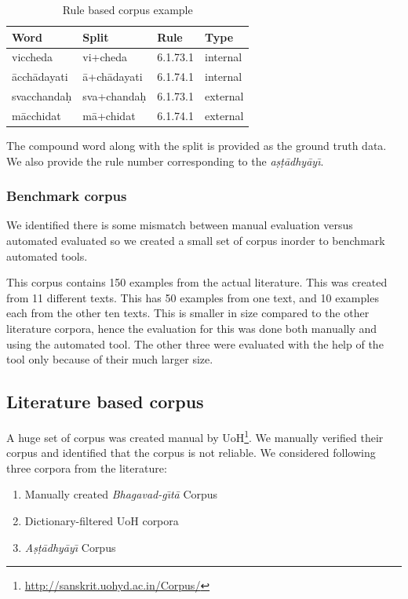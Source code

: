 \documentclass[11pt]{article}
\begin{document}
\begin{table}[h]
	\begin{center}
		\begin{tabular}{|p{1.9cm}|p{1.9cm}|p{1.1cm}|p{1.1cm}|}
			\hline 
			\bf Word	& \bf Split	& \bf Rule	& \bf Type \\
			\hline
			viccheda &	vi+cheda &	6.1.73.1 &	internal \\
			\={a}cch\={a}dayati	& \={a}+ch\={a}dayati	& 6.1.74.1	&	internal \\
			svacchanda\d{h}	& sva+chanda\d{h}	& 6.1.73.1 &	external \\
			m\={a}cchidat &	m\={a}+chidat &	6.1.74.1 &	external\\
			
			\hline
		\end{tabular}
	\end{center}
	\caption{\label{ruletable} Rule based corpus example }
\end{table}

The compound word along with the split is provided as the ground truth data. We also provide the rule number corresponding to the  \textit{a\d{s}\d{t}\={a}dhy\={a}y\={\i}}. 

\subsubsection{Benchmark corpus}
We identified there is some mismatch between manual evaluation versus automated evaluated so we created a small set of corpus inorder to benchmark automated tools.

This corpus contains 150 examples from the actual literature.  This was created from 11 different texts. This has 50 examples from one text, and 10 examples each from the other ten texts. This is smaller in size compared to the other literature corpora, hence the evaluation for this was done both manually and using the automated tool. The other three were evaluated with the help of the tool only because of their much larger size.

\subsection{Literature based corpus}
A huge set of corpus was created manual by UoH\footnote{\url{http://sanskrit.uohyd.ac.in/Corpus/}}. We manually verified their corpus and identified that the corpus is not reliable. We considered following three corpora from the literature: 

\begin{enumerate}
	\item  Manually created \textit{Bhagavad-g\={\i}t\={a}} Corpus
	\item  Dictionary-filtered UoH corpora
	\item  \textit{A\d{s}\d{t}\={a}dhy\={a}y\={\i}} Corpus
\end{enumerate}
\end{document}

